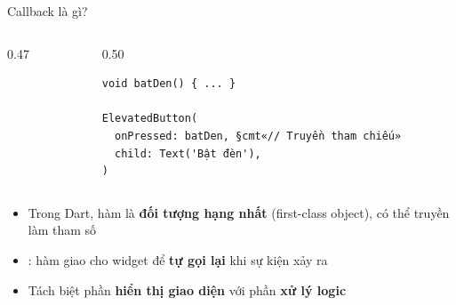 \documentclass[aspectratio=169, 11pt]{beamer}
\newcommand{\code}[1]{\leavevmode{\ttfamily\color{DarkMain}#1}}
\begin{document}
\begin{frame}[fragile]{Callback là gì?}
  \vspace{0.18cm}
  \begin{columns}[c, onlytextwidth]
    \begin{column}{0.47\textwidth}
      \centering
    \end{column}
    \hfill
    \begin{column}{0.50\textwidth}
      \begin{codepanel}
\begin{Verbatim}[commandchars=§«»,fontsize=\fontsize{8.5pt}{12.5pt}\selectfont]
void batDen() { ... }

ElevatedButton(
  onPressed: batDen, §cmt«// Truyền tham chiếu»
  child: Text('Bật đèn'),
)
\end{Verbatim}
      \end{codepanel}
    \end{column}
  \end{columns}

  \vspace{0.44cm}
  \begin{itemize}\setlength{\itemsep}{0.25cm}
    \item Trong Dart, hàm là \textbf{đối tượng hạng nhất} (first-class object), có thể truyền làm tham số
    \item \code{Callback}: hàm giao cho widget để \textbf{tự gọi lại} khi sự kiện xảy ra
    \item Tách biệt phần \textbf{hiển thị giao diện} với phần \textbf{xử lý logic}
  \end{itemize}
\end{frame}
\end{document}
